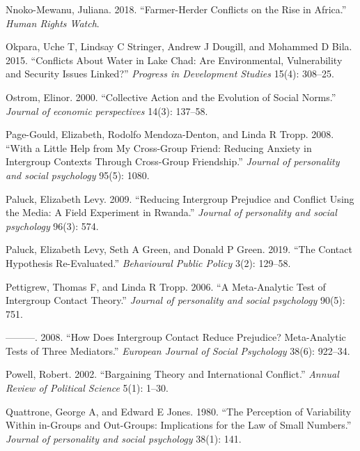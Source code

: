\documentclass[11pt]{article}
\begin{document}
\leavevmode\hypertarget{ref-hrc2018farmer}{}%
Nnoko-Mewanu, Juliana. 2018. ``Farmer-Herder Conflicts on the Rise in
Africa.'' \emph{Human Rights Watch}.

\leavevmode\hypertarget{ref-okpara2015conflicts}{}%
Okpara, Uche T, Lindsay C Stringer, Andrew J Dougill, and Mohammed D
Bila. 2015. ``Conflicts About Water in Lake Chad: Are Environmental,
Vulnerability and Security Issues Linked?'' \emph{Progress in
Development Studies} 15(4): 308--25.

\leavevmode\hypertarget{ref-ostrom2000collective}{}%
Ostrom, Elinor. 2000. ``Collective Action and the Evolution of Social
Norms.'' \emph{Journal of economic perspectives} 14(3): 137--58.

\leavevmode\hypertarget{ref-page2008little}{}%
Page-Gould, Elizabeth, Rodolfo Mendoza-Denton, and Linda R Tropp. 2008.
``With a Little Help from My Cross-Group Friend: Reducing Anxiety in
Intergroup Contexts Through Cross-Group Friendship.'' \emph{Journal of
personality and social psychology} 95(5): 1080.

\leavevmode\hypertarget{ref-paluck2009jsp}{}%
Paluck, Elizabeth Levy. 2009. ``Reducing Intergroup Prejudice and
Conflict Using the Media: A Field Experiment in Rwanda.'' \emph{Journal
of personality and social psychology} 96(3): 574.

\leavevmode\hypertarget{ref-paluck2019contact}{}%
Paluck, Elizabeth Levy, Seth A Green, and Donald P Green. 2019. ``The
Contact Hypothesis Re-Evaluated.'' \emph{Behavioural Public Policy}
3(2): 129--58.

\leavevmode\hypertarget{ref-pettigrew2006meta}{}%
Pettigrew, Thomas F, and Linda R Tropp. 2006. ``A Meta-Analytic Test of
Intergroup Contact Theory.'' \emph{Journal of personality and social
psychology} 90(5): 751.

\leavevmode\hypertarget{ref-pettigrew2008does}{}%
---------. 2008. ``How Does Intergroup Contact Reduce Prejudice?
Meta-Analytic Tests of Three Mediators.'' \emph{European Journal of
Social Psychology} 38(6): 922--34.

\leavevmode\hypertarget{ref-powell2002bargaining}{}%
Powell, Robert. 2002. ``Bargaining Theory and International Conflict.''
\emph{Annual Review of Political Science} 5(1): 1--30.

\leavevmode\hypertarget{ref-quattrone1980perception}{}%
Quattrone, George A, and Edward E Jones. 1980. ``The Perception of
Variability Within in-Groups and Out-Groups: Implications for the Law of
Small Numbers.'' \emph{Journal of personality and social psychology}
38(1): 141.
\end{document}
